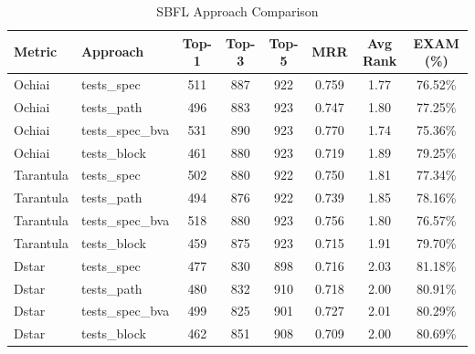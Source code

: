 \begin{table}[htbp]
\centering
\begin{tabular}{l l c c c c c c}
\hline
Metric & Approach & Top-1 & Top-3 & Top-5 & MRR & Avg Rank & EXAM (\%) \\
\hline
Ochiai & tests_spec & 511 & 887 & 922 & 0.759 & 1.77 & 76.52\% \\
Ochiai & tests_path & 496 & 883 & 923 & 0.747 & 1.80 & 77.25\% \\
Ochiai & tests_spec_bva & 531 & 890 & 923 & 0.770 & 1.74 & 75.36\% \\
Ochiai & tests_block & 461 & 880 & 923 & 0.719 & 1.89 & 79.25\% \\
Tarantula & tests_spec & 502 & 880 & 922 & 0.750 & 1.81 & 77.34\% \\
Tarantula & tests_path & 494 & 876 & 922 & 0.739 & 1.85 & 78.16\% \\
Tarantula & tests_spec_bva & 518 & 880 & 923 & 0.756 & 1.80 & 76.57\% \\
Tarantula & tests_block & 459 & 875 & 923 & 0.715 & 1.91 & 79.70\% \\
Dstar & tests_spec & 477 & 830 & 898 & 0.716 & 2.03 & 81.18\% \\
Dstar & tests_path & 480 & 832 & 910 & 0.718 & 2.00 & 80.91\% \\
Dstar & tests_spec_bva & 499 & 825 & 901 & 0.727 & 2.01 & 80.29\% \\
Dstar & tests_block & 462 & 851 & 908 & 0.709 & 2.00 & 80.69\% \\
\hline
\end{tabular}
\caption{SBFL Approach Comparison}
\label{tab:sbfl_comparison}
\end{table}
